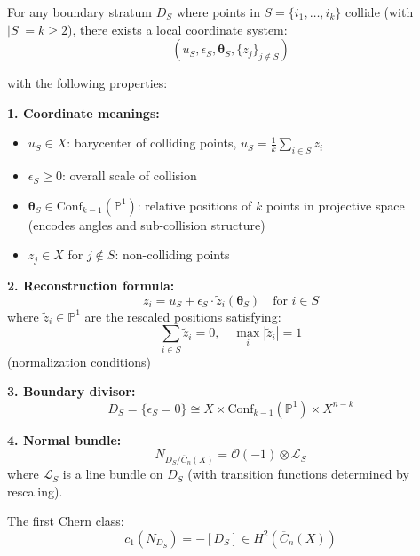 \begin{theorem}\label{thm:complete-coordinates}
For any boundary stratum $D_S$ where points in $S = \{i_1, \ldots, i_k\}$ collide
(with $|S| = k \geq 2$), there exists a local coordinate system:
$$(u_S, \epsilon_S, \boldsymbol{\theta}_S, \{z_j\}_{j \notin S})$$

with the following properties:

\textbf{1. Coordinate meanings:}
\begin{itemize}
\item $u_S \in X$: barycenter of colliding points, $u_S = \frac{1}{k}\sum_{i \in S} z_i$
\item $\epsilon_S \geq 0$: overall scale of collision
\item $\boldsymbol{\theta}_S \in \text{Conf}_{k-1}(\mathbb{P}^1)$: relative positions of
$k$ points in projective space (encodes angles and sub-collision structure)
\item $z_j \in X$ for $j \notin S$: non-colliding points
\end{itemize}

\textbf{2. Reconstruction formula:}
$$z_i = u_S + \epsilon_S \cdot \tilde{z}_i(\boldsymbol{\theta}_S) \quad \text{for } i \in S$$
where $\tilde{z}_i \in \mathbb{P}^1$ are the rescaled positions satisfying:
$$\sum_{i \in S} \tilde{z}_i = 0, \quad \max_i |\tilde{z}_i| = 1$$
(normalization conditions)

\textbf{3. Boundary divisor:}
$$D_S = \{\epsilon_S = 0\} \cong X \times \text{Conf}_{k-1}(\mathbb{P}^1) \times X^{n-k}$$

\textbf{4. Normal bundle:}
$$N_{D_S/\overline{C}_n(X)} = \mathcal{O}(-1) \otimes \mathcal{L}_S$$
where $\mathcal{L}_S$ is a line bundle on $D_S$ (with transition functions determined
by rescaling).

The first Chern class:
$$c_1(N_{D_S}) = -[D_S] \in H^2(\overline{C}_n(X))$$
\end{theorem}


